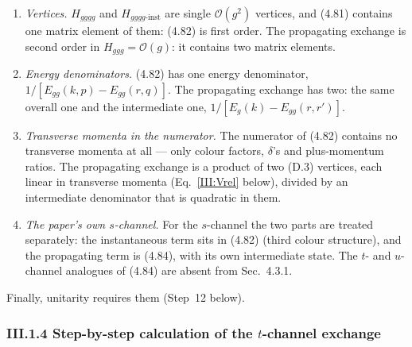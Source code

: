 \begin{enumerate}[leftmargin=20pt,itemsep=3pt]
\item \emph{Vertices.} $H_{gggg}$ and $H_{gggg\text{-inst}}$ are single $\mathcal O(g^2)$ vertices, and (4.81) contains one matrix element of them: (4.82) is first order. The propagating exchange is second order in $H_{ggg}=\mathcal O(g)$: it contains two matrix elements.
\item \emph{Energy denominators.} (4.82) has one energy denominator, $1/[E_{gg}(k,p)-E_{gg}(r,q)]$. The propagating exchange has two: the same overall one and the intermediate one, $1/[E_g(k)-E_{gg}(r,r')]$.
\item \emph{Transverse momenta in the numerator.} The numerator of (4.82) contains no transverse momenta at all --- only colour factors, $\delta$'s and plus-momentum ratios. The propagating exchange is a product of two (D.3) vertices, each linear in transverse momenta (Eq.~\eqref{III:Vrel} below), divided by an intermediate denominator that is quadratic in them.
\item \emph{The paper's own $s$-channel.} For the $s$-channel the two parts are treated separately: the instantaneous term sits in (4.82) (third colour structure), and the propagating term is (4.84), with its own intermediate state. The $t$- and $u$-channel analogues of (4.84) are absent from Sec.~4.3.1.
\end{enumerate}
Finally, unitarity requires them (Step~12 below).

\subsubsection*{III.1.4 Step-by-step calculation of the $t$-channel exchange}

